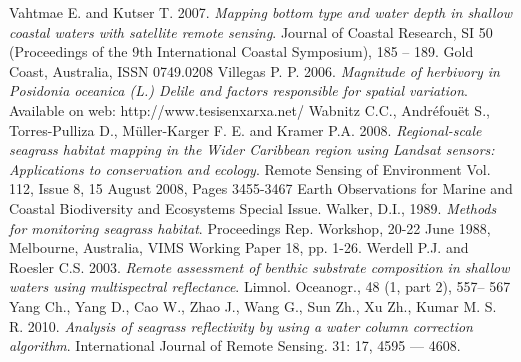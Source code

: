 \documentclass[10pt, a4paper]{article}
\begin{document}
\begin{thebibliography}{999}
Vahtmae E. and Kutser T. 2007. \emph{Mapping bottom type and water depth in shallow
coastal waters with satellite remote sensing}. Journal of Coastal Research, SI 50 (Proceedings
of the 9th International Coastal Symposium), 185 – 189. Gold Coast, Australia, ISSN
0749.0208 \pageref{Vahtmae07}
Villegas P. P. 2006. \emph{Magnitude of herbivory in \textit{Posidonia oceanica} (L.) Delile and
factors responsible for spatial variation}. Available on web: http://www.tesisenxarxa.net/ \pageref{Villegas06}
Wabnitz C.C., Andréfouët S., Torres-Pulliza D., Müller-Karger F. E. and Kramer P.A.
2008. \emph{Regional-scale seagrass habitat mapping in the Wider Caribbean region using
Landsat sensors: Applications to conservation and ecology}. Remote Sensing of
Environment Vol. 112, Issue 8, 15 August 2008, Pages 3455-3467 Earth Observations for
Marine and Coastal Biodiversity and Ecosystems Special Issue. \pageref{Wabnitz08}
Walker, D.I., 1989. \emph{Methods for monitoring seagrass habitat}. Proceedings Rep.
Workshop, 20-22 June 1988, Melbourne, Australia, VIMS Working Paper 18, pp. 1-26. \pageref{Walker89}
Werdell P.J. and Roesler C.S. 2003. \emph{Remote assessment of benthic substrate composition
in shallow waters using multispectral reflectance}. Limnol. Oceanogr., 48 (1, part 2), 557–
567 \pageref{Werdell03}
Yang Ch., Yang D., Cao W., Zhao J., Wang G., Sun Zh., Xu Zh., Kumar M. S. R. 2010. 
\emph{Analysis of seagrass reflectivity by using a water column correction algorithm}. International
Journal of Remote Sensing. 31: 17, 4595 — 4608. \pageref{Yang10}

\end{thebibliography}
\end{document}
